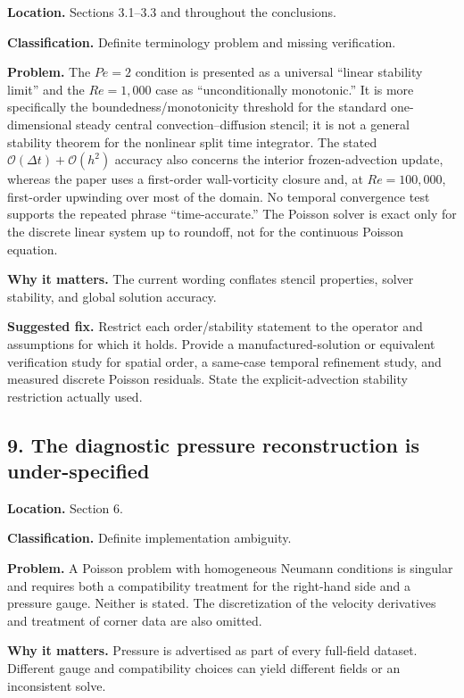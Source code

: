 \documentclass[11pt]{article}
\newcommand{\Rey}{\mathit{Re}}
\begin{document}
\textbf{Location.} Sections 3.1--3.3 and throughout the conclusions.

\textbf{Classification.} Definite terminology problem and missing verification.

\textbf{Problem.} The $Pe=2$ condition is presented as a universal ``linear stability limit'' and the $\Rey=1{,}000$ case as ``unconditionally monotonic.'' It is more specifically the boundedness/monotonicity threshold for the standard one-dimensional steady central convection--diffusion stencil; it is not a general stability theorem for the nonlinear split time integrator. The stated $\mathcal{O}(\Delta t)+\mathcal{O}(h^2)$ accuracy also concerns the interior frozen-advection update, whereas the paper uses a first-order wall-vorticity closure and, at $\Rey=100{,}000$, first-order upwinding over most of the domain. No temporal convergence test supports the repeated phrase ``time-accurate.'' The Poisson solver is exact only for the discrete linear system up to roundoff, not for the continuous Poisson equation.

\textbf{Why it matters.} The current wording conflates stencil properties, solver stability, and global solution accuracy.

\textbf{Suggested fix.} Restrict each order/stability statement to the operator and assumptions for which it holds. Provide a manufactured-solution or equivalent verification study for spatial order, a same-case temporal refinement study, and measured discrete Poisson residuals. State the explicit-advection stability restriction actually used.

\subsection*{9. The diagnostic pressure reconstruction is under-specified}

\textbf{Location.} Section 6.

\textbf{Classification.} Definite implementation ambiguity.

\textbf{Problem.} A Poisson problem with homogeneous Neumann conditions is singular and requires both a compatibility treatment for the right-hand side and a pressure gauge. Neither is stated. The discretization of the velocity derivatives and treatment of corner data are also omitted.

\textbf{Why it matters.} Pressure is advertised as part of every full-field dataset. Different gauge and compatibility choices can yield different fields or an inconsistent solve.
\end{document}

